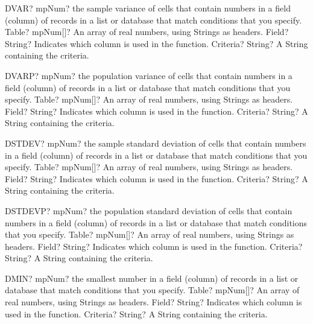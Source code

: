 \documentclass[12pt,a4paper,openany]{book}
\begin{document}
\begin{mpFunctionsExtract}
\mpWorksheetFunctionThreeNotImplemented
{DVAR? mpNum? the sample variance of cells that contain numbers in a field (column) of records in a list or database that match conditions that you specify.}
{Table? mpNum[]? An array of real numbers, using Strings as headers.}
{Field? String? Indicates which column is used in the function.}
{Criteria? String? A String containing the criteria.}
\end{mpFunctionsExtract}

\begin{mpFunctionsExtract}
\mpWorksheetFunctionThreeNotImplemented
{DVARP? mpNum? the population variance of cells that contain numbers in a field (column) of records in a list or database that match conditions that you specify.}
{Table? mpNum[]? An array of real numbers, using Strings as headers.}
{Field? String? Indicates which column is used in the function.}
{Criteria? String? A String containing the criteria.}
\end{mpFunctionsExtract}

\begin{mpFunctionsExtract}
\mpWorksheetFunctionThreeNotImplemented
{DSTDEV? mpNum? the sample standard deviation of cells that contain numbers in a field (column) of records in a list or database that match conditions that you specify.}
{Table? mpNum[]? An array of real numbers, using Strings as headers.}
{Field? String? Indicates which column is used in the function.}
{Criteria? String? A String containing the criteria.}
\end{mpFunctionsExtract}

\begin{mpFunctionsExtract}
\mpWorksheetFunctionThreeNotImplemented
{DSTDEVP? mpNum? the population standard deviation of cells that contain numbers in a field (column) of records in a list or database that match conditions that you specify.}
{Table? mpNum[]? An array of real numbers, using Strings as headers.}
{Field? String? Indicates which column is used in the function.}
{Criteria? String? A String containing the criteria.}
\end{mpFunctionsExtract}

\begin{mpFunctionsExtract}
\mpWorksheetFunctionThreeNotImplemented
{DMIN? mpNum? the smallest number in a field (column) of records in a list or database that match conditions that you specify.}
{Table? mpNum[]? An array of real numbers, using Strings as headers.}
{Field? String? Indicates which column is used in the function.}
{Criteria? String? A String containing the criteria.}
\end{mpFunctionsExtract}
\end{document}
